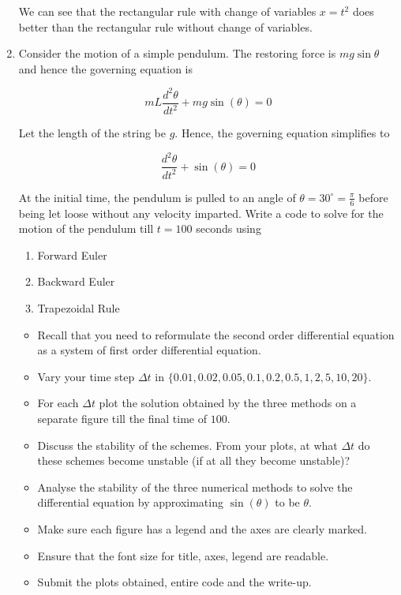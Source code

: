 \documentclass[a4paper,11pt]{report}
\begin{document}
\begin{enumerate}
    

    We can see that the rectangular rule with change of variables $x = t^{2}$ does better than the rectangular rule without change of variables.

    \item Consider the motion of a simple pendulum. The restoring force is $mg \sin \theta$
    and hence the governing equation is

    \begin{equation*}
    mL \frac{d^{2} \theta}{dt^{2}} + mg \sin(\theta) = 0
    \end{equation*}

    Let the length of the string be $g$. Hence, the governing equation simplifies to
                    
    \begin{equation*}
    \frac{d^{2} \theta}{dt^{2}} + \sin(\theta) = 0
    \end{equation*}

    At the initial time, the pendulum is pulled to an angle of $\theta = 30^{\circ} =
    \displaystyle \frac{\pi}{6}$
    before being let loose without any velocity imparted. Write a code to solve for the
    motion of the pendulum till $t = 100$ seconds using

    \begin{enumerate}
    \item Forward Euler
    \item Backward Euler
    \item Trapezoidal Rule
    \end{enumerate}

    \begin{itemize}
    \item Recall that you need to reformulate the second order differential equation as a
    system of first order differential equation.
    \item Vary your time step $\Delta t$ in $\{0.01, 0.02, 0.05, 0.1, 0.2, 0.5, 1, 2, 5,
    10, 20\}$.
    \item For each $\Delta t$ plot the solution obtained by the three methods on a separate
    figure till the final time of $100$.
    \item Discuss the stability of the schemes. From your plots, at what $\Delta t$ do these
    schemes become unstable (if at all they become unstable)?
    \item Analyse the stability of the three numerical methods to solve the differential
    equation by approximating $\sin(\theta)$ to be $\theta$.
    \item Make sure each figure has a legend and the axes are clearly marked.
    \item Ensure that the font size for title, axes, legend are readable.
    \item Submit the plots obtained, entire code and the write-up.
    \end{itemize}



\end{enumerate}
\end{document}
